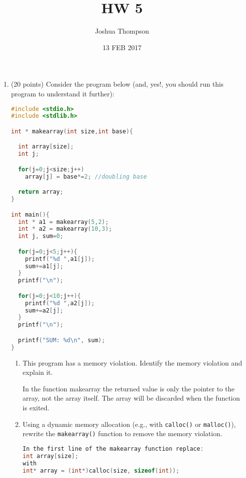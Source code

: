 \documentclass{article}[9pt]
\title{HW 5}
\author{Joshua Thompson}
\date{13 FEB 2017}
\newenvironment{answerfont}{\fontfamily{qhv}\selectfont}{\par}
\newenvironment{myanswer}{\begin{mdframed}\begin{answerfont}}{\end{answerfont}\end{mdframed}}
\begin{document}
\maketitle


\begin{enumerate}
\item (20 points) Consider the program below (and, yes!, you should run this program to
understand it further):

\begin{lstlisting}[language=c]
#include <stdio.h>
#include <stdlib.h>

int * makearray(int size,int base){

  int array[size];
  int j;

  for(j=0;j<size;j++)
    array[j] = base*=2; //doubling base

  return array;
}

int main(){
  int * a1 = makearray(5,2);
  int * a2 = makearray(10,3);
  int j, sum=0;

  for(j=0;j<5;j++){
    printf("%d ",a1[j]);
    sum+=a1[j];
  }
  printf("\n");

  for(j=0;j<10;j++){
    printf("%d ",a2[j]);
    sum+=a2[j];
  }
  printf("\n");

  printf("SUM: %d\n", sum);
}
\end{lstlisting}


\begin{enumerate}
\item This program has a memory violation. Identify the memory violation and explain it.

\begin{myanswer}
In the function makearray the returned value is only the pointer to the array, not the array itself.
The array will be discarded when the function is exited.
\end{myanswer}

\item Using a dynamic memory allocation (e.g., with \texttt{calloc()} or
\texttt{malloc()}), rewrite the \texttt{makearray()} function to remove the
memory violation.

\begin{myanswer}
\begin{lstlisting}[language=c]
In the first line of the makearray function replace:
int array[size];
with
int* array = (int*)calloc(size, sizeof(int));
\end{lstlisting}
\end{myanswer}



\end{enumerate}
\end{enumerate}
\end{document}
